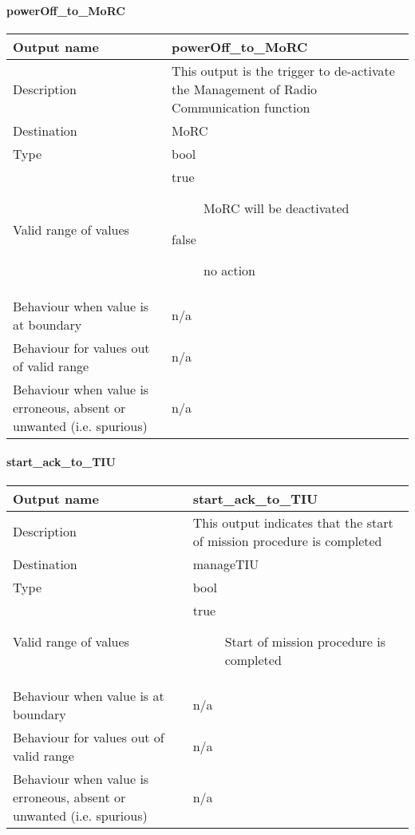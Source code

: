 \paragraph{powerOff\_to\_MoRC}

\begin{longtable}{p{}p{}}
\toprule
Output name				& powerOff\_to\_MoRC \\
\midrule
Description				& This output is the trigger to de-activate the Management of Radio Communication function \\
\midrule
Destination				& MoRC \\ 
\midrule
Type					& bool \\
\midrule
Valid range of values	& \begin{description}
\item[true]MoRC will be deactivated 
\item[false]no action
\end{description} \\
\midrule
Behaviour when value is at boundary	& n/a \\
\midrule
Behaviour for values out of valid range	& n/a \\
\midrule
Behaviour when value is erroneous, absent or unwanted (i.e. spurious) & n/a \\
\bottomrule
\end{longtable}

\paragraph{start\_ack\_to\_TIU}

\begin{longtable}{p{}p{}}
\toprule
Output name				& start\_ack\_to\_TIU \\
\midrule
Description				& This output indicates that the start of mission procedure is completed \\
\midrule
Destination				& manageTIU \\ 
\midrule
Type					& bool \\
\midrule
Valid range of values	&  \begin{description}
\item[true]Start of mission procedure is completed 
\end{description} \\
\midrule
Behaviour when value is at boundary	& n/a \\
\midrule
Behaviour for values out of valid range	& n/a \\
\midrule
Behaviour when value is erroneous, absent or unwanted (i.e. spurious) & n/a \\
\bottomrule
\end{longtable}


